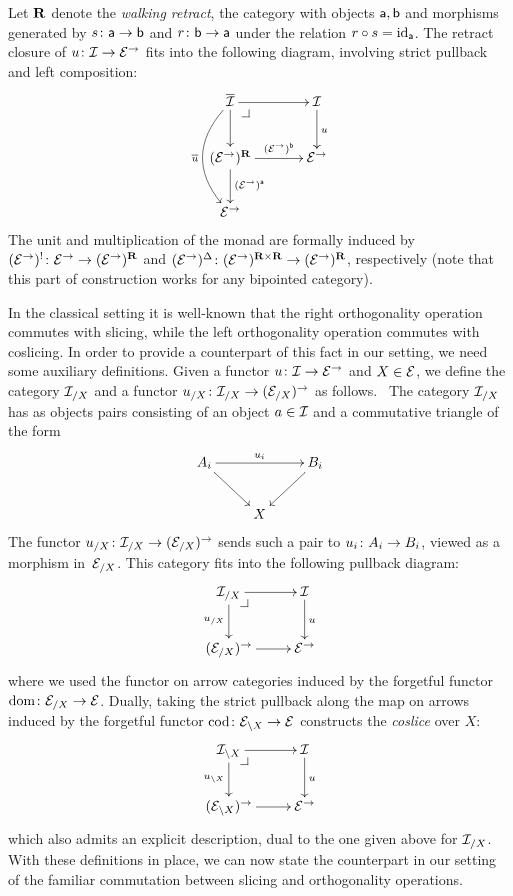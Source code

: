 \documentclass[reqno,10pt,a4paper,oneside,draft]{amsart}
\begin{document}
\begin{remark}
Let $\ret$ denote the \emph{walking retract}, \ie the category with objects $\retA, \retB$ and morphisms generated by $s \co \retA \to \retB$ and $r \co \retB \to \retA$ under the relation $r \cc s = \id_{\retA}$.
The retract closure of $u \co \cal{I} \to \catE^\to$ fits into the following diagram, involving strict pullback and left composition:
\[
\xymatrix@C+1em{
  \overline{\cal{I}}
  \ar[r]
  \ar[d]
  \ar@/_2em/[dd]_{\overline{u}}
  \pullback{dr}
&
  \cal{I}
  \ar[d]^{u}
\\
  (\catE^\to)^{\ret}
  \ar[r]^-{(\catE^\to)^{\retB}}
  \ar[d]^{(\catE^\to)^{\retA}}
&
  \catE^\to
\\
  \catE^\to
}
\]
The unit and multiplication of the monad are formally induced by $(\catE^\to)^{\canonical} \co \catE^\to \to (\catE^\to)^{\ret}$ and $(\catE^\to)^{\Delta} \co (\catE^\to)^{\ret \times \ret} \to (\catE^\to)^{\ret}$, respectively (note that this part of construction works for any bipointed category).
\end{remark}


In the classical setting it is well-known that the right orthogonality operation commutes with slicing, while the left orthogonality operation commutes with coslicing.
In order to provide a counterpart of this fact in our setting, we need some auxiliary definitions.
Given a functor $u \co \cal{I} \to \catE^\to$ and $X \in \catE$, we define the category $\cal{I}_{/X}$ and a functor $u_{/X} \co 
\cal{I}_{/X} \to (\cal{E}_{/X})^\to$ as follows. \
The category $\cal{I}_{/X}$ has as objects pairs consisting of an object $a \in \cal{I}$ and a commutative triangle of the form
\[
\xymatrix{
  A_i \ar[dr] \ar[rr]^{u_i} & & B_i \ar[dl] \\
  & X
}
\]
The functor $u_{/X} \co \cal{I}_{/X} \to (\cal{E}_{/X})^\to$ sends such a pair to $u_i \co A_i \to B_i$, viewed as a morphism in~$\cal{E}_{/X}$.
This category fits into the following pullback diagram:
\[
\xymatrix{
  \cal{I}_{/X}
  \ar[r]
  \ar[d]_{u_{/X}}
  \pullback{dr}
&
  \cal{I}
  \ar[d]^{u}
\\
  (\catE_{/X})^\to
  \ar[r]
&
  \catE^\to
}
\]
where we used the functor on arrow categories induced by the forgetful functor $\operatorname{dom} \co \catE_{/X} \to \catE$.
Dually, taking the strict pullback along the map on arrows induced by the forgetful functor $\operatorname{cod} \co \cal{E}_{\backslash X} \to \catE$ constructs the \emph{coslice} over $X$:
\[
\xymatrix{
 \cal{I}_{\backslash X}
  \ar[r]
  \ar[d]_{u_{\backslash X}}
  \pullback{dr}
&
  \cal{I}
  \ar[d]^{u}
\\
  (\catE_{\backslash X})^\to
  \ar[r]
&
  \catE^\to
}
\]
which also admits an explicit description, dual to the one given above for $\cal{I}_{/X}$.
With these definitions in place, we can now state the counterpart in our setting of the familiar commutation between slicing and orthogonality operations.
\end{document}
